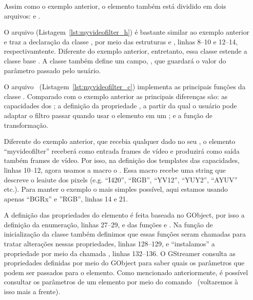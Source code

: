 Assim como o exemplo anterior, o elemento  também está
dividido em dois arquivos:  e .

O arquivo  (Listagem~\ref{lst:myvideofilter_h}) é bastante
similar ao exemplo anterior e traz a declaração da classe ,
por meio das estruturas  e ,
linhas 8--10 e 12--14, respectivamtente.  Diferente do exemplo anterior,
entretanto, essa classe estende a classe base .  A classe
 também define um campo, , que guardará o valor do
parâmetro passado pelo usuário.



O arquivo ~(Listagem~\ref{lst:myvideofilter_c}) implementa
as principais funções da classe .  Comparado com o exemplo
anterior as principais diferenças são: as capacidades dos ; a
definição da propriedade , a partir da qual o usuário pode adaptar o
filtro passar quando usar o elemento em um ; e a função de
transformação.



Diferente do exemplo anterior, que recebia qualquer dado no seu ,
o elemento ``myvideofilter'' receberá como entrada frames de vídeo e produzirá
como saída também frames de vídeo.  Por isso, na definição dos templates das
capacidades, linhas 10--12, agora usamos a macro o .
Essa macro recebe uma string que descreve o leaiute dos pixels (e.g. ``I420'',
``RGB'', ``YV12'', ``YUY2'', ``AYUV'' etc.).  Para manter o exemplo o mais
simples possível, aqui estamos usando apenas ``BGRx'' e ''RGB'', linhas 14 e
21.

A definição das propriedades do elemento é feita baseada no 
GObject, por isso a definição da enumeração, linhas 27--29, e das funções
 e .  Na
função de inicialização da classe  também
definimos que essas funções seram chamadas para tratar alterações nessas
propriedades, linhas 128--129, e ``instalamos'' a propriedade por meio da
chamada , linhas 132--136.  O GStreamer consulta
as propriedades definidas por meio do GObject para saber quais os parâmetros
que podem ser passados para o elemento.  Como mencionado anteriormente, é
possível consultar os parâmetros de um elemento por meio do comando
~(voltaremos à isso mais a frente).

